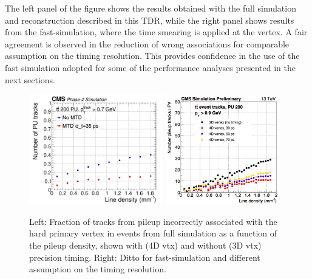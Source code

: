 The left panel of the figure shows the results obtained with the full
simulation and reconstruction described in this TDR, while the right
panel shows results from the fast-simulation, where the time smearing
is applied at the vertex. A fair agreement is observed in the
reduction of wrong associations for comparable assumption on the
timing resolution. This provides confidence in the use of the fast
simulation adopted for some of the performance analyses presented in
the next sections.  

\begin{figure}[hbtp]
\centering
\includegraphics[width=0.52\textwidth]{fig/performance/trkvtx/track_pu_vs_linden_s.pdf}
\includegraphics[width=0.44\textwidth]{fig/performance/trkvtx/nPUTracks_fromNtuple_tres.png}
 \caption{Left: Fraction of tracks from pileup incorrectly 
   associated with the hard primary vertex in \ttbar events from full
   simulation as a function of the pileup density, shown with (4D vtx)
   and without (3D vtx) precision timing. Right: Ditto for
   fast-simulation and different assumption on the timing resolution.}
   \label{fig:trkvtx}
\end{figure}

